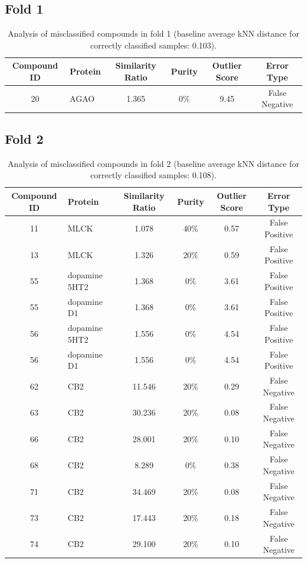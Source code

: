 \documentclass{article}
\newenvironment{smarttabular}[1]{%
    \begin{tabular}{#1}%
}{%
    \end{tabular}%
}
\begin{document}
\subsection{Fold 1}

\begin{table}[H]
    \centering
    \small
    \caption{Analysis of misclassified compounds in fold 1 (baseline average kNN distance for correctly classified samples: 0.103).}
    \label{tab:misclassified_compounds_1}
    \begin{smarttabular}{clcccc}
        \toprule
        \textbf{Compound ID} & \textbf{Protein} & \textbf{Similarity Ratio} & \textbf{Purity} & \textbf{Outlier Score} & \textbf{Error Type} \\
        \midrule
        20 & AGAO & 1.365 & 0\% & 9.45 & False Negative \\
        \bottomrule
    \end{smarttabular}
\end{table}

\clearpage

\subsection{Fold 2}

\begin{table}[H]
    \centering
    \small
    \caption{Analysis of misclassified compounds in fold 2 (baseline average kNN distance for correctly classified samples: 0.108).}
    \label{tab:misclassified_compounds_2}
    \begin{smarttabular}{clcccc}
        \toprule
        \textbf{Compound ID} & \textbf{Protein} & \textbf{Similarity Ratio} & \textbf{Purity} & \textbf{Outlier Score} & \textbf{Error Type} \\
        \midrule
        11 & MLCK & 1.078 & 40\% & 0.57 & False Positive \\
        13 & MLCK & 1.326 & 20\% & 0.59 & False Positive \\
        55 & dopamine 5HT2 & 1.368 & 0\% & 3.61 & False Positive \\
        55 & dopamine D1 & 1.368 & 0\% & 3.61 & False Positive \\
        56 & dopamine 5HT2 & 1.556 & 0\% & 4.54 & False Positive \\
        56 & dopamine D1 & 1.556 & 0\% & 4.54 & False Positive \\
        62 & CB2 & 11.546 & 20\% & 0.29 & False Negative \\
        63 & CB2 & 30.236 & 20\% & 0.08 & False Negative \\
        66 & CB2 & 28.001 & 20\% & 0.10 & False Negative \\
        68 & CB2 & 8.289 & 0\% & 0.38 & False Negative \\
        71 & CB2 & 34.469 & 20\% & 0.08 & False Negative \\
        73 & CB2 & 17.443 & 20\% & 0.18 & False Negative \\
        74 & CB2 & 29.100 & 20\% & 0.10 & False Negative \\
        \bottomrule
    \end{smarttabular}
\end{table}
\end{document}
